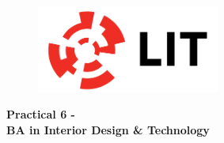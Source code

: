 

\newpage
\setcounter{page}{1}
\begin{center}
	\begin{figure}[ht]
		\centering
		\includegraphics[width = 6cm]{img/LITlogo.jpg}
		\label{fig:logoa6}
	\end{figure}
	\Large\textbf{Practical 6 - }\\
	\large\textbf{BA in Interior Design \& Technology}
\end{center}

